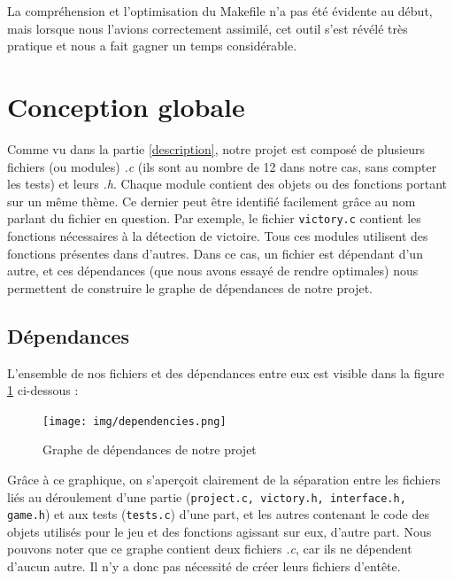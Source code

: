 \documentclass[a4paper]{article}
\begin{document}
La compréhension et l'optimisation du Makefile n'a pas été évidente au début, mais lorsque nous l'avions correctement assimilé, cet outil s'est révélé très pratique et nous a fait gagner un temps considérable.


\section{Conception globale}
\label{conception}

Comme vu dans la partie \ref{description}, notre projet est composé de plusieurs fichiers (ou modules) \emph{.c} (ils sont au nombre de 12 dans notre cas, sans compter les tests) et leurs \emph{.h}. Chaque module contient des objets ou des fonctions portant sur un même thème. Ce dernier peut être identifié facilement grâce au nom parlant du fichier en question. Par exemple, le fichier \verb|victory.c| contient les fonctions nécessaires à la détection de victoire. Tous ces modules utilisent des fonctions présentes dans d'autres. Dans ce cas, un fichier est dépendant d'un autre, et ces dépendances (que nous avons essayé de rendre optimales) nous permettent de construire le graphe de dépendances de notre projet.

\subsection{Dépendances}
\label{dep}

L'ensemble de nos fichiers et des dépendances entre eux est visible dans la figure \ref{fig:dep} ci-dessous :

\begin{center}
\begin{figure}[H]
    \centering
    \texttt{[image: img/dependencies.png]}~\\[0.5 cm]
    \caption{Graphe de dépendances de notre projet}
    \label{fig:dep}
\end{figure}
\end{center}

Grâce à ce graphique, on s'aperçoit clairement de la séparation entre les fichiers liés au déroulement d'une partie (\verb|project.c, victory.h, interface.h, game.h|) et aux tests (\verb|tests.c|) d'une part, et les autres contenant le code des objets utilisés pour le jeu et des fonctions agissant sur eux, d'autre part. Nous pouvons noter que ce graphe contient deux fichiers \emph{.c}, car ils ne dépendent d'aucun autre. Il n'y a donc pas nécessité de créer leurs fichiers d'entête.
\end{document}
